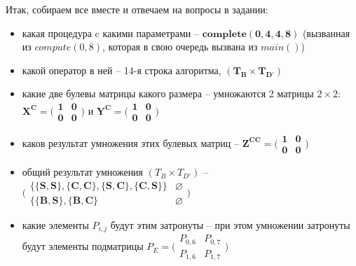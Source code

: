 \documentclass[russian,table]{article}
\begin{document}

Итак, собираем все вместе и отвечаем на вопросы в задании:

\begin{itemize}
\item какая процедура c какими параметрами -- $\mathbf{complete(0, 4, 4, 8)}$ (вызванная из $compute(0, 8)$, которая в свою очередь вызвана из $main()$)
\item какой оператор в ней -- 14-я строка алгоритма, $\mathbf{(T_B \times T_{D'})}$
\item какие две булевы матрицы какого размера -- умножаются 2 матрицы $2 \times 2$: $\mathbf{X^C = \bigl(\begin{smallmatrix} 1&0\\0&0 \end{smallmatrix} \bigr)}$ и $\mathbf{Y^C = \bigl(\begin{smallmatrix} 1&0\\0&0 \end{smallmatrix} \bigr)}$
\item каков результат умножения этих булевых матриц -- $\mathbf{Z^{CC} = \bigl(\begin{smallmatrix} 1&0\\0&0 \end{smallmatrix} \bigr)}$
\item общий результат умножения $(T_B \times T_{D'})$ -- $\mathbf{\bigl(\begin{smallmatrix} \{\{S, S\}, \{C, C\}, \{S, C\}, \{C, S\}\} & \varnothing  \\ \{\{B, S\}, \{B, C\} & \varnothing \end{smallmatrix} \bigr)}$
\item какие элементы $P_{i,j}$ будут этим затронуты -- при этом умножении затронуты будут элементы подматрицы $P_E = \bigl(\begin{smallmatrix} P_{0, 6} & P_{0, 7} \\ P_{1, 6} &P_{1, 7} \end{smallmatrix} \bigr)$
\end{itemize}
\end{document}
